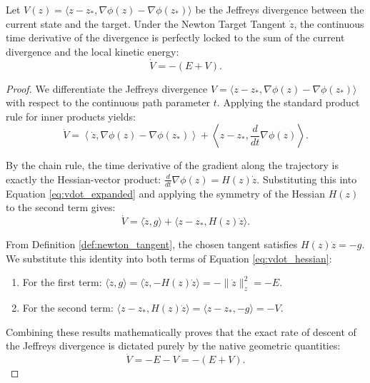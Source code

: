 \begin{lemma}
\label{lem:divergence_derivative}
Let $V(z) = \langle z - z_*, \nabla \phi(z) - \nabla \phi(z_*) \rangle$ be the Jeffreys divergence between the current state and the target. Under the Newton Target Tangent $\dot{z}$, the continuous time derivative of the divergence is perfectly locked to the sum of the current divergence and the local kinetic energy:
\begin{equation}
    \dot{V} = -(E + V).
\end{equation}
\end{lemma}

\begin{proof}
We differentiate the Jeffreys divergence $V = \langle z - z_*, \nabla \phi(z) - \nabla \phi(z_*) \rangle$ with respect to the continuous path parameter $t$. Applying the standard product rule for inner products yields:
\begin{equation} \label{eq:vdot_expanded}
    \dot{V} = \left\langle \dot{z}, \nabla \phi(z) - \nabla \phi(z_*) \right\rangle + \left\langle z - z_*, \frac{d}{dt} \nabla \phi(z) \right\rangle.
\end{equation}

By the chain rule, the time derivative of the gradient along the trajectory is exactly the Hessian-vector product: $\frac{d}{dt}\nabla \phi(z) = H(z)\dot{z}$. Substituting this into Equation \ref{eq:vdot_expanded} and applying the symmetry of the Hessian $H(z)$ to the second term gives:
\begin{equation} \label{eq:vdot_hessian}
    \dot{V} = \langle \dot{z}, g \rangle + \langle z - z_*, H(z)\dot{z} \rangle.
\end{equation}

From Definition \ref{def:newton_tangent}, the chosen tangent satisfies $H(z)\dot{z} = -g$. We substitute this identity into both terms of Equation \ref{eq:vdot_hessian}:
\begin{enumerate}
    \item For the first term: $\langle \dot{z}, g \rangle = \langle \dot{z}, -H(z)\dot{z} \rangle = -\|\dot{z}\|_z^2 = -E$.
    \item For the second term: $\langle z - z_*, H(z)\dot{z} \rangle = \langle z - z_*, -g \rangle = -V$.
\end{enumerate}

Combining these results mathematically proves that the exact rate of descent of the Jeffreys divergence is dictated purely by the native geometric quantities:
\begin{equation}
    \dot{V} = -E - V = -(E + V).
\end{equation}
\end{proof}



